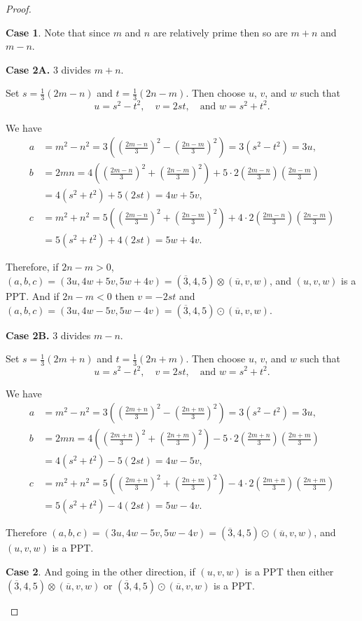 \documentclass{article}
\theoremstyle{definition}
\newtheorem{case}{Case}[section]
\begin{document}
\begin{proof}
\begin{case}
Note that since \(m\) and \(n\) are relatively prime then so are \(m+n\) and \(m-n\).

\bigskip
\textbf{Case 2A.} 3 divides \(m+n\).

Set \(s=\frac{1}{3}(2m-n)\) and \(t=\frac{1}{3}(2n-m)\). Then choose \(u\), \(v\), and \(w\) such that \[ u=s^2-t^2,\quad v=2st, \quad\text{and } w=s^2+t^2.\]

We have
\[\begin{aligned}
a &= m^2-n^2=3\left(\left(\frac{2m-n}{3}\right)^2-\left(\frac{2n-m}{3}\right)^2\right) = 3\left(s^2-t^2\right)=3u, \\
b &= 2mn=4\left(\left(\frac{2m-n}{3}\right)^2+\left(\frac{2n-m}{3}\right)^2\right) + 5\cdot 2\left(\frac{2m-n}{3}\right)\left(\frac{2n-m}{3}\right) \\ 
&= 4(s^2+t^2)+5(2st)=4w+5v, \\
c &= m^2+n^2=5\left(\left(\frac{2m-n}{3}\right)^2+\left(\frac{2n-m}{3}\right)^2\right) + 4\cdot 2\left(\frac{2m-n}{3}\right)\left(\frac{2n-m}{3}\right) \\
&= 5(s^2+t^2)+4(2st)=5w+4v.
\end{aligned}\]

Therefore, if \(2n-m>0\), \((a,b,c)=(3u,4w+5v,5w+4v)=(\overline{3},4,5)\otimes(\overline{u},v,w)\), and \((u,v,w)\) is a PPT. And if \(2n-m<0\) then \(v=-2st\) and \((a,b,c)=(3u,4w-5v,5w-4v)=(\overline{3},4,5)\odot(\overline{u},v,w)\).

\bigskip
\textbf{Case 2B.} 3 divides \(m-n\).

Set \(s=\frac{1}{3}(2m+n)\) and \(t=\frac{1}{3}(2n+m)\). Then choose \(u\), \(v\), and \(w\) such that \[ u=s^2-t^2, \quad v=2st, \quad \text{and } w=s^2+t^2. \]

We have
\[\begin{aligned}
a &= m^2-n^2=3\left(\left(\frac{2m+n}{3}\right)^2-\left(\frac{2n+m}{3}\right)^2\right) = 3\left(s^2-t^2\right)=3u, \\
b &= 2mn=4\left(\left(\frac{2m+n}{3}\right)^2+\left(\frac{2n+m}{3}\right)^2\right) - 5\cdot 2\left(\frac{2m+n}{3}\right)\left(\frac{2n+m}{3}\right) \\
&= 4(s^2+t^2)-5(2st)=4w-5v,	 \\
c &= m^2+n^2=5\left(\left(\frac{2m+n}{3}\right)^2+\left(\frac{2n+m}{3}\right)^2\right) - 4\cdot 2\left(\frac{2m+n}{3}\right)\left(\frac{2n+m}{3}\right) \\
&= 5(s^2+t^2)-4(2st)=5w-4v.
\end{aligned}\]

Therefore \((a,b,c)=(3u,4w-5v,5w-4v)=(\overline{3},4,5)\odot(\overline{u},v,w)\), and \((u,v,w)\) is a PPT.
\end{case}
\begin{case}
And going in the other direction, if \((u,v,w)\) is a PPT then either \((\overline{3},4,5)\otimes(\overline{u},v,w)\) or \((\overline{3},4,5)\odot(\overline{u},v,w)\) is a PPT.
\end{case}


\end{proof}
\end{document}

